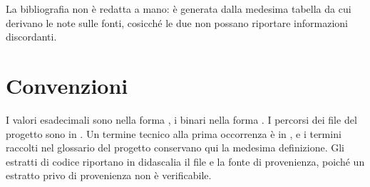 La bibliografia non è redatta a mano: è generata dalla medesima tabella da cui derivano le
note sulle fonti, cosicché le due non possano riportare informazioni discordanti.

\section*{Convenzioni}

I valori esadecimali sono nella forma , i binari nella forma . I
percorsi dei file del progetto sono in . Un termine tecnico alla prima
occorrenza è in , e i termini raccolti nel glossario del progetto conservano
qui la medesima definizione. Gli estratti di codice riportano in didascalia il file e la
fonte di provenienza, poiché un estratto privo di provenienza non è verificabile.
